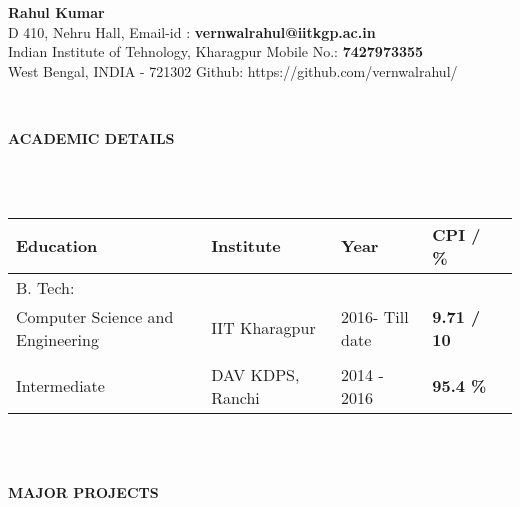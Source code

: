 \documentclass[a4paper,10pt]{article}
\newcommand{\lsep}{-0.5cm}
\newcommand{\resheading}[1]{{\small \colorbox{mygrey}{\begin{minipage}{0.975\textwidth}{\textbf{#1 \vphantom{p\^{E}}}}\end{minipage}}}}
\begin{document}
\begin{center}
\textbf{\Huge Rahul Kumar \\ }  
\indent \hfill \break
\indent D 410, Nehru Hall, \hfill Email-id : \textbf{vernwalrahul@iitkgp.ac.in} \\
\indent Indian Institute of Tehnology, Kharagpur \hfill Mobile No.: \textbf{7427973355} \\
\indent West Bengal, INDIA - 721302  \hfill Github: {https://github.com/vernwalrahul/} \\
\end{center}

\hspace{0.5cm}\\[-0.2cm]
\resheading{\textbf{ACADEMIC DETAILS} }\\[\lsep]
\\ 

\indent \begin{tabular}{ l @{\hskip 0.25in} l @{\hskip 0.25in} l @{\hskip 0.25in} l @{\hskip 0.25in} l }
\hline
\textbf{Education} & \textbf{Institute} & \textbf{Year} & \textbf{CPI / \%} \\
\hline
B. Tech:\\
{Computer Science and Engineering} & IIT Kharagpur  & 2016- Till date & \textbf{9.71 / 10} \\ \\
Intermediate & DAV KDPS, Ranchi & 2014 - 2016 & \textbf{95.4 \%}\\
\hline
\end{tabular}
\\ \hfill \break \\
\resheading{\textbf{MAJOR PROJECTS} }\\[\lsep]
\end{document}
